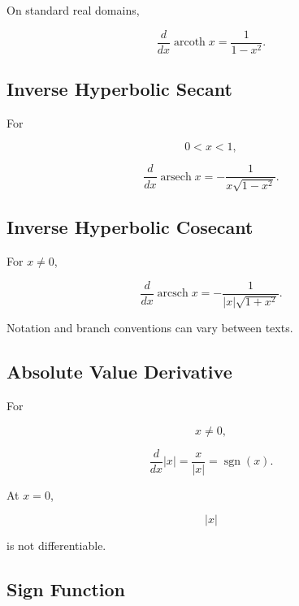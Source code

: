 On standard real domains,

\[
\boxed{
\frac{d}{dx}
\operatorname{arcoth}x
=
\frac{1}{1-x^2}.
}
\]

\subsection{Inverse Hyperbolic Secant}
\label{subsec:inverse-sech-derivative}

For

\[
0<x<1,
\]

\[
\boxed{
\frac{d}{dx}
\operatorname{arsech}x
=
-\frac{
1
}{
x\sqrt{1-x^2}
}.
}
\]

\subsection{Inverse Hyperbolic Cosecant}
\label{subsec:inverse-csch-derivative}

For \(x\neq0\),

\[
\boxed{
\frac{d}{dx}
\operatorname{arcsch}x
=
-\frac{
1
}{
|x|\sqrt{1+x^2}
}.
}
\]

Notation and branch conventions can vary between texts.

\subsection{Absolute Value Derivative}
\label{subsec:absolute-value-derivative}

For

\[
x\neq0,
\]

\[
\boxed{
\frac{d}{dx}|x|
=
\frac{x}{|x|}
=
\operatorname{sgn}(x).
}
\]

At \(x=0\),

\[
\boxed{
|x|
}
\]

is not differentiable.

\subsection{Sign Function}
\label{subsec:sign-function-derivative-reference}

